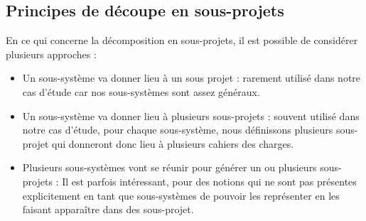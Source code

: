 \subsection{Principes de découpe en sous-projets}
En ce qui concerne la décomposition en sous-projets, il est possible de considérer plusieurs approches :
\begin{itemize}
\item Un sous-système va donner lieu à un sous projet : rarement utilisé dans notre cas d'étude car nos sous-systèmes sont assez généraux.
\item Un sous-système va donner lieu à plusieurs sous-projets : souvent utilisé dans notre cas d'étude, pour chaque sous-système, nous définissons plusieurs sous-projet qui donneront donc lieu à plusieurs cahiers des charges.
\item Plusieurs sous-systèmes vont se réunir pour générer un ou plusieurs sous-projets : Il est parfois intéressant, pour des notions qui ne sont pas présentes explicitement en tant que sous-systèmes de pouvoir les représenter en les faisant apparaître dans des sous-projet.
\end{itemize}


